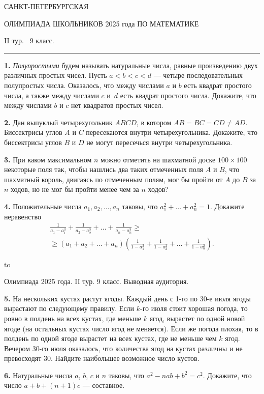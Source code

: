 \documentclass[12pt]{article}
\def\q#1.{{\bf #1. }}
\def\dotline{\smallskip\hbox to \hsize{\dotfill}\medskip}
\begin{document}
\centerline{\sc САНКТ-ПЕТЕРБУРГСКАЯ}
\centerline{\sc ОЛИМПИАДА ШКОЛЬНИКОВ 2025 года ПО МАТЕМАТИКЕ}
\centerline{\sc II тур. \ 9 класс.}
\medskip
\hrule
\bigskip

\q1. \emph{Полупростыми} будем называть натуральные числа, равные произведению двух различных простых чисел. Пусть $a<b<c<d$ --- четыре последовательных полупростых числа. Оказалось, что между числами $a$ и $b$ есть квадрат простого числа, а также между числами $c$ и~$d$ есть квадрат простого числа. Докажите, что между числами $b$ и $c$ нет квадратов простых чисел.

\q2. Дан выпуклый четырехугольник $ABCD$, в котором $AB = BC = CD \neq AD$. Биссектрисы углов $A$ и $C$ пересекаются внутри четырехугольника. Докажите, что биссектрисы углов $B$ и $D$ не могут пересечься внутри четырехугольника.

\q3. При каком максимальном $n$ можно 
отметить на шахматной доске $100\times 100$ некоторые поля так, чтобы нашлись два таких отмеченных поля $A$ и $B$, что шахматный король, двигаясь по отмеченным полям, мог бы пройти от $A$ до $B$ за $n$ ходов, но не мог бы пройти менее чем за $n$ ходов?

\setlength{\multlinegap}{0pt}

\q4. Положительные числа $a_1, a_2, \ldots, a_n$ таковы, что $a_1^2+\ldots+a_n^2 =1$. Докажите неравенство
\begin{multline*}
\frac{1}{a_1-a_1^3} + \frac{1}{a_2-a_2^3} + \ldots +\frac{1}{a_n-a_n^3} 
\geq\\ \geq 
\left(a_1+a_2+\ldots+a_n \right) \left( \frac{1}{1-a_1^2} + \frac{1}{1-a_2^2} + \ldots + \frac{1}{1-a_n^2} \right).
\end{multline*}

\dotline

\centerline{Олимпиада 2025 года. II тур. 9 класс. Выводная аудитория.}
\smallskip

\q5. На нескольких кустах растут ягоды. Каждый день с 1-го по 30-е июля ягоды вырастают по следующему правилу. Если $k$-го июля стоит хорошая погода, то ровно в полдень на всех кустах, где меньше $k$ ягод, вырастет по одной новой ягоде (на остальных кустах число ягод не меняется). Если же погода плохая, то в полдень по одной ягоде вырастет на всех кустах, где не меньше чем $k$ ягод. Вечером 30-го июля оказалось, что количества ягод на кустах различны и не превосходят 30. Найдите наибольшее возможное число кустов.

\q6. Натуральные числа $a$, $b$, $c$ и $n$ таковы, что $a^2-nab+b^2=c^2$. Докажите, что число $a+b+(n+1)c$ --- составное.
\end{document}
